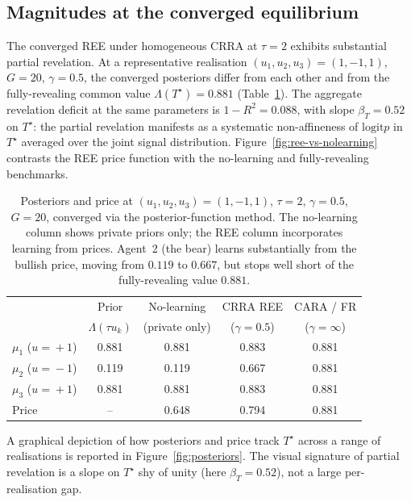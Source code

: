 \documentclass[12pt,letterpaper]{article}
\theoremstyle{definition}
\theoremstyle{remark}
\newcommand{\Lam}{\Lambda}            %
\newcommand{\logit}{\mathrm{logit}}
\newcommand{\Tstar}{T^{\!\star}}
\newcommand{\1}{\mathbf{1}}
\begin{document}
\subsection{Magnitudes at the converged equilibrium}\label{sec:posteriors}

The converged REE under homogeneous CRRA at $\tau=2$ exhibits substantial
partial revelation. At a representative realisation
$(u_{1},u_{2},u_{3})=(1,-1,1)$, $G=20$, $\gamma=0.5$, the converged
posteriors differ from each other and from the fully-revealing common
value $\Lam(\Tstar)=0.881$ (Table~\ref{tab:posteriors}). The aggregate
revelation deficit at the same parameters is $1-R^{2}=0.088$, with
slope $\beta_{T}=0.52$ on $\Tstar$: the partial revelation manifests as a
systematic non-affineness of $\logit p$ in $\Tstar$ averaged over the
joint signal distribution. Figure~\ref{fig:ree-vs-nolearning}
contrasts the REE price function with the no-learning and
fully-revealing benchmarks.

\begin{table}[htbp]
   \centering
   \caption{Posteriors and price at $(u_{1},u_{2},u_{3})=
   (1,-1,1)$, $\tau=2$, $\gamma=0.5$, $G=20$, converged via the
   posterior-function method. The no-learning column shows private priors
   only; the REE column incorporates learning from prices. Agent~2 (the
   bear) learns substantially from the bullish price, moving from $0.119$
   to $0.667$, but stops well short of the fully-revealing value $0.881$.}
   \label{tab:posteriors}
   \begin{tabular}{lcccc}
      \toprule
       & Prior & No-learning & CRRA REE & CARA / FR \\
       & $\Lam(\tau u_{k})$ & (private only) & ($\gamma\!=\!0.5$) & ($\gamma\!=\!\infty$) \\
      \midrule
      \rowcolor{black!8} $\mu_{1}$ ($u\!=\!+1$) & 0.881 & 0.881 & 0.883 & 0.881 \\
      \rowcolor{black!8} $\mu_{2}$ ($u\!=\!-1$) & 0.119 & 0.119 & 0.667 & 0.881 \\
      \rowcolor{black!8} $\mu_{3}$ ($u\!=\!+1$) & 0.881 & 0.881 & 0.883 & 0.881 \\
      \rowcolor{black!8} Price                  & --    & 0.648 & 0.794 & 0.881 \\
      \bottomrule
   \end{tabular}
\end{table}

A graphical depiction of how posteriors and price track $\Tstar$ across
a range of realisations is reported in Figure~\ref{fig:posteriors}.
The visual signature of partial revelation is a slope on $\Tstar$
shy of unity (here $\beta_{T}=0.52$), not a large per-realisation
gap.
\end{document}

